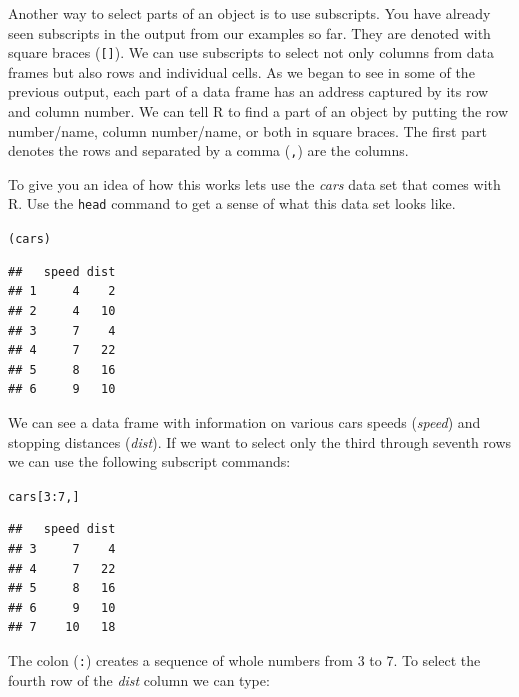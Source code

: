 Another way to select parts of an object is to use subscripts. You have already seen subscripts in the output from our examples so far. They are denoted with square braces (\texttt{[]}). We can use subscripts to select not only columns from data frames but also rows and individual cells. As we began to see in some of the previous output, each part of a data frame has an address captured by its row and column number. We can tell R to find a part of an object by putting the row number/name, column number/name, or both in square braces. The first part denotes the rows and separated by a comma (\texttt{,}) are the columns. 

To give you an idea of how this works lets use the {\emph{cars}} data set that comes with R. Use the \texttt{head} command to get a sense of what this data set looks like.

\begin{knitrout}
\color{fgcolor}\begin{kframe}
\begin{alltt}
(cars)
\end{alltt}
\begin{verbatim}
##   speed dist
## 1     4    2
## 2     4   10
## 3     7    4
## 4     7   22
## 5     8   16
## 6     9   10
\end{verbatim}
\end{kframe}
\end{knitrout}


\noindent We can see a data frame with information on various cars speeds ({\emph{speed}}) and stopping distances ({\emph{dist}}). If we want to select only the third through seventh rows we can use the following subscript commands:

\begin{knitrout}
\color{fgcolor}\begin{kframe}
\begin{alltt}
cars[3:7, ]
\end{alltt}
\begin{verbatim}
##   speed dist
## 3     7    4
## 4     7   22
## 5     8   16
## 6     9   10
## 7    10   18
\end{verbatim}
\end{kframe}
\end{knitrout}


\noindent The colon (\texttt{:}) creates a sequence of whole numbers from 3 to 7. To select the fourth row of the {\emph{dist}} column we can type:

